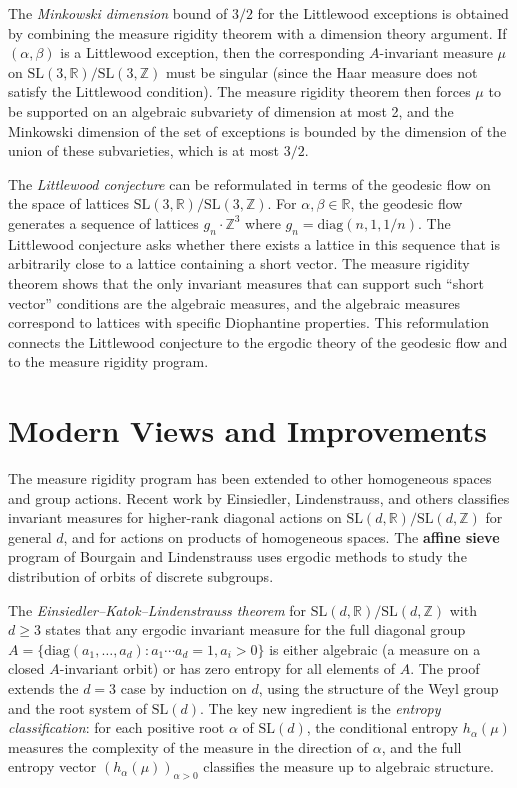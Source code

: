 The \emph{Minkowski dimension} bound of $3/2$ for the Littlewood exceptions is obtained by combining the measure rigidity theorem with a dimension theory argument. If $(\alpha, \beta)$ is a Littlewood exception, then the corresponding $A$-invariant measure $\mu$ on $\text{SL}(3,\mathbb{R})/\text{SL}(3,\mathbb{Z})$ must be singular (since the Haar measure does not satisfy the Littlewood condition). The measure rigidity theorem then forces $\mu$ to be supported on an algebraic subvariety of dimension at most 2, and the Minkowski dimension of the set of exceptions is bounded by the dimension of the union of these subvarieties, which is at most $3/2$.

The \emph{Littlewood conjecture} can be reformulated in terms of the geodesic flow on the space of lattices $\text{SL}(3,\mathbb{R})/\text{SL}(3,\mathbb{Z})$. For $\alpha, \beta \in \mathbb{R}$, the geodesic flow generates a sequence of lattices $g_n \cdot \mathbb{Z}^3$ where $g_n = \text{diag}(n, 1, 1/n)$. The Littlewood conjecture asks whether there exists a lattice in this sequence that is arbitrarily close to a lattice containing a short vector. The measure rigidity theorem shows that the only invariant measures that can support such ``short vector'' conditions are the algebraic measures, and the algebraic measures correspond to lattices with specific Diophantine properties. This reformulation connects the Littlewood conjecture to the ergodic theory of the geodesic flow and to the measure rigidity program.

\section{Modern Views and Improvements}\label{ch2010elonlindenstrauss:modern-views-and-improvements}

The measure rigidity program has been extended to other homogeneous spaces and group actions. Recent work by Einsiedler, Lindenstrauss, and others classifies invariant measures for higher-rank diagonal actions on $\text{SL}(d,\mathbb{R})/\text{SL}(d,\mathbb{Z})$ for general $d$, and for actions on products of homogeneous spaces. The \textbf{affine sieve} program of Bourgain and Lindenstrauss uses ergodic methods to study the distribution of orbits of discrete subgroups.

The \emph{Einsiedler--Katok--Lindenstrauss theorem} for $\text{SL}(d,\mathbb{R})/\text{SL}(d,\mathbb{Z})$ with $d \ge 3$ states that any ergodic invariant measure for the full diagonal group $A = \{\text{diag}(a_1, \ldots, a_d) : a_1 \cdots a_d = 1, a_i > 0\}$ is either algebraic (a measure on a closed $A$-invariant orbit) or has zero entropy for all elements of $A$. The proof extends the $d = 3$ case by induction on $d$, using the structure of the Weyl group and the root system of $\text{SL}(d)$. The key new ingredient is the \emph{entropy classification}: for each positive root $\alpha$ of $\text{SL}(d)$, the conditional entropy $h_\alpha(\mu)$ measures the complexity of the measure in the direction of $\alpha$, and the full entropy vector $(h_\alpha(\mu))_{\alpha > 0}$ classifies the measure up to algebraic structure.

